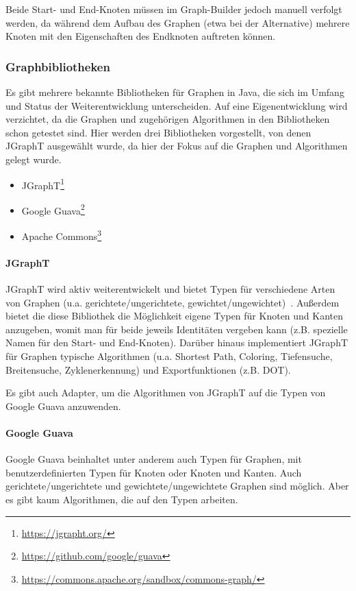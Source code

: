 \documentclass[../InterneDSLs.tex]{subfiles}
\begin{document}
Beide Start- und End-Knoten müssen im Graph-Builder jedoch manuell verfolgt werden, da während dem Aufbau des Graphen (etwa bei der Alternative) mehrere Knoten mit den Eigenschaften des Endknoten auftreten können.

\subsubsection{Graphbibliotheken}
Es gibt mehrere bekannte Bibliotheken für Graphen in Java, die sich im Umfang und Status der Weiterentwicklung unterscheiden. Auf eine Eigenentwicklung wird verzichtet, da die Graphen und zugehörigen Algorithmen in den Bibliotheken schon getestet sind. Hier werden drei Bibliotheken vorgestellt, von denen JGraphT ausgewählt wurde, da hier der Fokus auf die Graphen und Algorithmen gelegt wurde.
\begin{itemize}
	\item JGraphT\footnote{\url{https://jgrapht.org/}}
	\item Google Guava\footnote{\url{https://github.com/google/guava}}
	\item Apache Commons\footnote{\url{https://commons.apache.org/sandbox/commons-graph/}}
\end{itemize}

\paragraph{JGraphT}
JGraphT wird aktiv weiterentwickelt und bietet Typen für verschiedene Arten von Graphen (u.a. gerichtete/ungerichtete, gewichtet/ungewichtet)~\cite{JGraphT}. Außerdem bietet die diese Bibliothek die Möglichkeit eigene Typen für Knoten und Kanten anzugeben, womit man für beide jeweils Identitäten vergeben kann (z.B. spezielle Namen für den Start- und End-Knoten). Darüber hinaus implementiert JGraphT für Graphen typische Algorithmen (u.a. Shortest Path, Coloring, Tiefensuche, Breitensuche, Zyklenerkennung) und Exportfunktionen (z.B. DOT).

Es gibt auch Adapter, um die Algorithmen von JGraphT auf die Typen von Google Guava anzuwenden.

\paragraph{Google Guava}
Google Guava beinhaltet unter anderem auch Typen für Graphen, mit benutzerdefinierten Typen für Knoten oder Knoten und Kanten. Auch gerichtete/ungerichtete und gewichtete/ungewichtete Graphen sind möglich. Aber es gibt kaum Algorithmen, die auf den Typen arbeiten.
\end{document}
